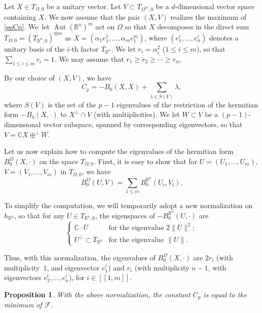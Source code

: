 \documentclass[JEP,XML,SOM,Unicode, NoEqCountersInSection,NoFloatCountersInSection,published]{cedram}
\let\mathcal\mathscr
\newcommand{\llbracket}{[\![}
\newcommand{\rrbracket}{]\!]}
\DeclareMathOperator{\Aut}{Aut}
\theoremstyle{theorem}
\newtheorem{proposition}{Proposition} [section]
\theoremstyle{definition}
\begin{document}
Let $X \in T_{\Omega, 0} $ be a unitary vector. Let $V \subset T_{\Omega^m, 0}$ be a $d$-dimensional vector space containing $X$. We now assume that the pair $(X, V)$ realizes the maximum of \eqref{eqCp}. We~let $\Aut(\mathbb B^n)^m$ act on $\Omega$ so that $X$ decomposes in the direct sum $T_{\Omega, 0} = (T_{\mathbb B^n, 0})^{\oplus m}$ as $X = (\alpha_1 e_1^1,\dots, \alpha_m e_1^m)$, where $(e_1^i,\dots, e_n^i)$ denotes a unitary basis of the $i$-th factor $T_{\mathbb B^n}$. We let $r_i = \alpha_i^2$ ($1 \leq i \leq m$), so that $\sum_{1 \leq i \leq m} r_i = 1$. We may assume that $r_1 \geq r_2 \geq \cdots \geq r_m$.

By our choice of $(X, V)$, we have
\begin{equation} \label{exprcp}
C_{p} = - B_0(X, X) + \sum_{\lambda \in S(V)} \lambda,
\end{equation}
where $S(V)$ is the set of the $p-1$ eigenvalues of the restriction of the hermitian form $ - B_0(X, \cdot)$ to $X^{\perp} \cap V$ (with multiplicities). We let $W \subset V$ be a $(p-1)$-dimensional vector subspace, spanned by corresponding eigenvectors, so that $V = \mathbb C X\oplus^\perp W$.

Let us now explain how to compute the eigenvalues of the hermitian form $B_0^{\Omega}(X, \cdot)$ on the space $T_{\Omega, 0}$. First, it is easy to show that for $U = (U_1,\dots, U_m)$, $V = (V_1,\dots, V_m)$ in $T_{\Omega, 0}$, we have
\[
B_0^{\Omega} (U, V) = \sum_{1 \leq m} B_0^{\mathbb B^n}(U_i, V_i).
\]

To simplify the computation, we will temporarily adopt a new normalization on~$h_{\mathbb B^n}$, so that for any $U \in T_{\mathbb B^n, 0}$, the eigenspaces of $- B_0^{\mathbb B^n}(U, \cdot)$ are
\[
\begin{cases}
\mathbb C \cdot U & \text{for the eigenvalue } 2 \| U \|^2; \\
U^{\perp} \subset T_{\mathbb B^n} &\text{for the eigenvalue } \| U\|.
\end{cases}
\]

Thus, with this normalization, the eigenvalues of $B_0^{\Omega} (X, \cdot)$ are $2 r_i$ (with multiplicity~$1$, and eigenvector $e_1^i$) and $r_i$ (with multiplicity $n-1$, with eigenvectors $e_2^i,\dots, e_n^i$), for $i\in\llbracket1,m\rrbracket$.

\begin{proposition}
With the above normalization, the constant $C_p$ is equal to the minimum of $\mathcal F$.
\end{proposition}
\end{document}
